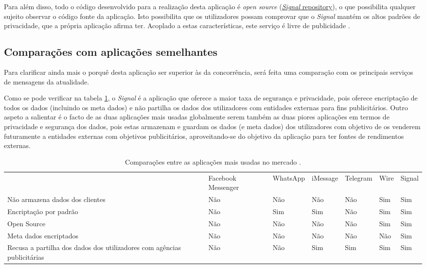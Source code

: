 Para além disso, todo o código desenvolvido para a realização desta aplicação é \textit{open source} (\hyperlink{https://github.com/signalapp}{\textit{Signal} repository}), o que possibilita qualquer sujeito observar o código fonte da aplicação. Isto possibilita que os utilizadores possam comprovar que o \textit{Signal} mantém os altos padrões de privacidade, que a própria aplicação afirma ter. Acoplado a estas características, este serviço é livre de publicidade \cite{signal_wikipedia, signal_popular}.

\subsection{Comparações com aplicações semelhantes}
\label{sec:comparacoes}
Para clarificar ainda mais o porquê desta aplicação ser superior às da concorrência, será feita uma comparação com os principais serviços de mensagens da atualidade.

Como se pode verificar na tabela \ref{tab:comparacoes}, o \textit{Signal} é a aplicação que oferece a maior taxa de segurança e privacidade, pois oferece encriptação de todos os dados (incluindo os meta dados) e não partilha os dados dos utilizadores com entidades externas para fins publicitários.
Outro aspeto a salientar é o facto de as duas aplicações mais usadas globalmente serem também as duas piores aplicações em termos de privacidade e segurança dos dados, pois estas armazenam e guardam os dados (e meta dados) dos utilizadores com objetivo de os venderem futuramente a entidades externas com objetivos publicitários, aproveitando-se do objetivo da aplicação para ter fontes de rendimentos externas.

\begin{table}[h]

\centering
\begin{adjustbox}{width=1\textwidth}
\begin{tabular}{lllllll}
                                & Facebook Messenger & WhatsApp & iMessage & Telegram & Wire & Signal \\
Não armazena dados dos clientes & Não                & Não      & Não      & Não      & Sim  & Sim    \\
Encriptação por padrão          & Não                & Sim      & Sim      & Não      & Sim  & Sim    \\
Open Source                     & Não                & Não      & Não      & Não      & Sim  & Sim    \\
Meta dados encriptados          & Não                & Não      & Não      & Não      & Não  & Sim    \\
Recusa a partilha dos dados dos utilizadores com agências publicitárias & Não & Não & Sim & Sim & Sim & Sim
\end{tabular}
\label{tab:comparacoes}
\end{adjustbox}
\caption{Comparações entre as aplicações mais usadas no mercado \cite{apps_comparation}.}
\end{table}


